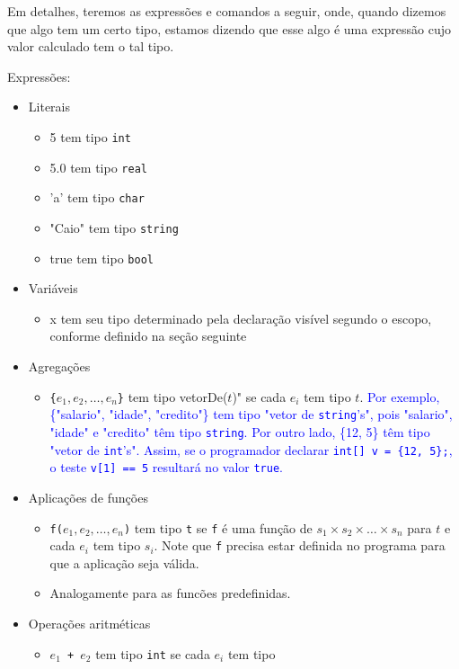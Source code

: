 \documentclass[12pt]{article}
\newcommand{\blu}{\textcolor{blue}}
\begin{document}
Em detalhes, teremos as expressões e comandos a seguir, onde, quando dizemos que algo tem um certo tipo, estamos dizendo que esse algo é uma expressão cujo valor calculado tem o tal tipo.

Expressões:

\begin{itemize}
\item Literais
	\begin{itemize}
    \item 5 tem tipo {\tt int}
    \item 5.0 tem tipo {\tt real}
    \item 'a' tem tipo {\tt char}
     \item "Caio" tem tipo {\tt string}
    \item true tem tipo {\tt bool}
	\end{itemize}
\item Variáveis
	\begin{itemize}
    \item x tem seu tipo determinado pela declaração visível segundo o escopo, conforme definido na seção seguinte
   	\end{itemize}
\item Agregações
	\begin{itemize}
    \item {\tt\{}$e_1, e_2, \ldots, e_n${\tt\}} tem tipo vetorDe($t$)"
    se cada $e_i$ tem tipo $t$. \blu{Por exemplo, \{"salario", "idade", "credito"\} tem tipo "vetor de {\tt string}'s", pois "salario", "idade" e "credito" têm tipo {\tt string}. Por outro lado, \{12, 5\} têm tipo "vetor de {\tt int}'s". Assim, se o programador declarar \texttt{int[] v = \{12, 5\};}, o teste \texttt{v[1] == 5} resultará no valor \texttt{true}.}
    \end{itemize}
\item Aplicações de funções
	\begin{itemize}
    \item {\tt f($e_1, e_2, \ldots, e_n$)} tem tipo {\tt t} se 
    {\tt f} é uma função de $s_1\times s_2\times\ldots\times s_n$ para
    $t$ e cada $e_i$ tem tipo $s_i$. Note que {\tt f} precisa estar definida
    no programa para que a aplicação seja válida.
    \item Analogamente para as funcões predefinidas.
    \end{itemize}
\item Operações aritméticas
	\begin{itemize}
    \item {\tt $e_1$ + $e_2$} tem tipo {\tt int} se cada $e_i$ tem tipo

\end{itemize}
\end{itemize}
\end{document}
